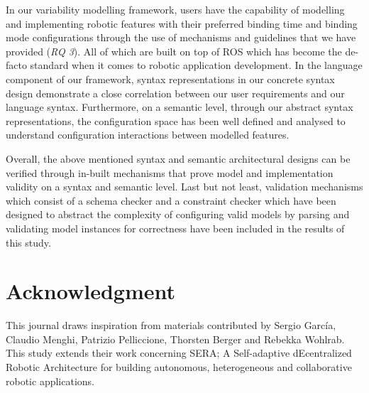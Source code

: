 \documentclass[conference]{IEEEtran}
\begin{document}
In our variability modelling framework, users have the capability of modelling and implementing robotic features with their preferred binding time and binding mode configurations through the use of mechanisms and guidelines that we have provided (\textit{RQ 3}). All of which are built on top of ROS which has become the de-facto standard when it comes to robotic application development. In the language component of our framework, syntax representations in our concrete syntax design demonstrate a close correlation between our user requirements and our language syntax. Furthermore, on a semantic level, through our abstract syntax representations, the configuration space has been well defined and analysed to understand configuration interactions between modelled features.

Overall, the above mentioned syntax and semantic architectural designs can be verified through in-built mechanisms that prove model and implementation validity on a syntax and semantic level. Last but not least, validation mechanisms which consist of a schema checker and a constraint checker which have been designed to abstract the complexity of configuring valid models by parsing and validating model instances for correctness have been included in the results of this study.

\section*{Acknowledgment}
This journal draws inspiration from materials contributed by Sergio Garc\'{i}a, Claudio Menghi, Patrizio Pelliccione, Thorsten Berger and Rebekka Wohlrab. This study extends their work concerning SERA; A Self-adaptive dEcentralized Robotic Architecture for building autonomous, heterogeneous and collaborative robotic applications. 
\end{document}
